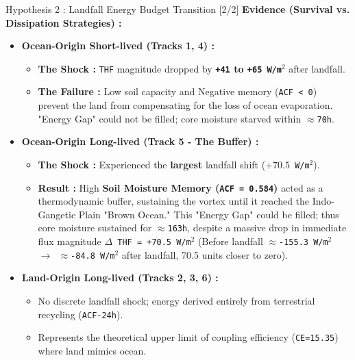 \begin{frame}{Hypothesis 2 : Landfall Energy Budget Transition [2/2]}
	\footnotesize
	\textbf{Evidence (Survival vs. Dissipation Strategies) :}
	\begin{itemize}
		\item \textbf{Ocean-Origin Short-lived (Tracks 1, 4) :}
		      \begin{itemize}\footnotesize
			      \item \textbf{The Shock :} \texttt{THF} magnitude dropped by \textbf{\texttt{+41} to \texttt{+65 W/m$^2$}} after landfall. \cite{nair2011influence}
			      \item \textbf{The Failure :} Low soil capacity and Negative memory (\texttt{ACF < 0}) prevent the land from compensating for the loss of ocean evaporation. "Energy Gap" could not be filled; core moisture starved within \texttt{$\approx$70h}.
		      \end{itemize}
		\item \textbf{Ocean-Origin Long-lived (Track 5 - The Buffer) :}
		      \begin{itemize}\footnotesize
			      \item \textbf{The Shock :} Experienced the \textbf{largest} landfall shift (\texttt{$+70.5$ W/m$^2$}).
			      \item \textbf{Result :} High \textbf{Soil Moisture Memory (\texttt{ACF = 0.584})} acted as a thermodynamic buffer, sustaining the vortex until it reached the Indo-Gangetic Plain "Brown Ocean." This "Energy Gap" could be filled; thus core moisture sustained for \texttt{$\approx$163h}, despite a massive drop in immediate flux magnitude \texttt{$\Delta$ THF = +70.5 W/m$^2$} (Before landfall \texttt{$\approx$-155.3  W/m$^2$ $\rightarrow$ $\approx$-84.8 W/m$^2$} after landfall, \scriptsize 70.5 units closer to zero\footnotesize). \cite{nair2011influence}
		      \end{itemize}
		\item \textbf{Land-Origin Long-lived (Tracks 2, 3, 6) :}
		      \begin{itemize}\footnotesize
			      \item No discrete landfall shock; energy derived entirely from terrestrial recycling (\texttt{ACF-24h}). \cite{chang2009}
			      \item Represents the theoretical upper limit of coupling efficiency (\texttt{CE=15.35}) where land mimics ocean. \cite{hunt2017effect}
		      \end{itemize}
	\end{itemize}


\end{frame}
